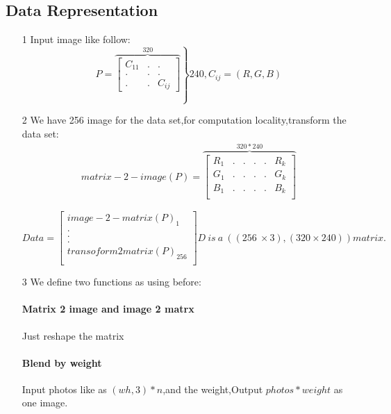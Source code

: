 \documentclass[letterpaper,12pt]{article}
\begin{document}
\subsection{Data Representation}
\begin{itemize}
\item[1]Input image like follow:
\begin{equation*}
P = 
\left.
\overbrace{
	\begin{bmatrix}
	C_{11} & . & . \\
	. & . & . \\
	. & . & C_{ij}
	\end{bmatrix}
}^{320}\right \}{240},C_{ij} = (R,G,B)
\end{equation*}
\item[2]We have 256 image for the data set,for computation locality,transform the data set:
\begin{equation*}
\begin{aligned}
matrix-2-image(P) = \overbrace{
	\begin{bmatrix}
	R_{1} & . & . & . & .& R_{k} \\
	G_{1} & . & . & . & .& G_{k} \\
	B_{1} & . & . & . & .& B_{k} \\
	\end{bmatrix}
}^{320*240}
\end{aligned}
\end{equation*}

\begin{equation*}
Data = 
\begin{bmatrix}
image-2-matrix(P)_{1}\\
. \\
. \\
. \\
transoform2matrix(P)_{256}\\
\end{bmatrix}
D\ is\ a\ ((256\ \times 3),(320 \times 240))matrix.
\end{equation*}
\item[3] We define two functions as using before:
\paragraph{Matrix 2 image and image 2 matrx}
Just reshape the matrix
\paragraph{Blend by weight}
Input photos like as $(wh,3)*n$,and the weight,Output $photos*weight$ as one image.
\end{itemize}
\end{document}
